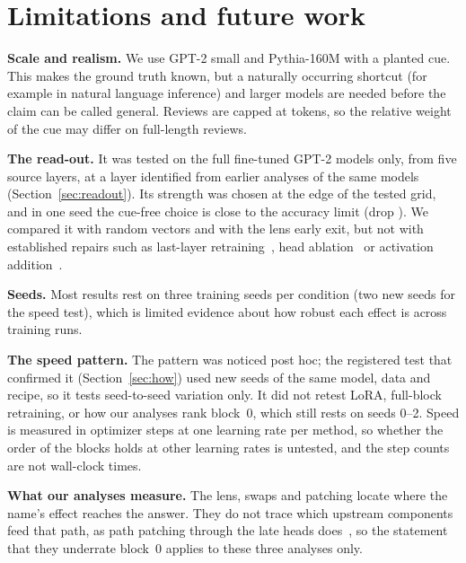 \section{Limitations and future work}
\label{sec:limitations}

\textbf{Scale and realism.} We use GPT-2 small and Pythia-160M with a planted cue. This makes the ground truth known,
but a naturally occurring shortcut (for example in natural language inference) and larger models are needed before the
claim can be called general. Reviews are capped at \reviewTokenCapPilot{} tokens, so the relative weight of the cue may
differ on full-length reviews.

\textbf{The read-out.} It was tested on the full fine-tuned GPT-2 models only, from five source layers, at a layer
identified from earlier analyses of the same models (Section~\ref{sec:readout}). Its strength was chosen at the edge
of the tested grid, and in one seed the cue-free choice is close to the accuracy limit (drop
\pSixBCueFreeDropFullFTsOne). We compared it with random vectors and with the lens early exit, but not with
established repairs such as last-layer retraining~\cite{kirichenko2023lastlayer}, head
ablation~\cite{eshuijs2025short} or activation addition~\cite{turner2023steering}.

\textbf{Seeds.} Most results rest on three training seeds per condition (two new seeds for the speed test), which is
limited evidence about how robust each effect is across training runs.

\textbf{The speed pattern.} The pattern was noticed post hoc; the registered test that confirmed it
(Section~\ref{sec:how}) used new seeds of the same model, data and recipe, so it tests seed-to-seed variation only. It
did not retest LoRA, full-block retraining, or how our analyses rank block~0, which still rests on seeds 0--2. Speed is measured in optimizer steps at one learning rate per method, so whether the order
of the blocks holds at other learning rates is untested, and the step counts are not wall-clock times.

\textbf{What our analyses measure.} The lens, swaps and patching locate where the name's effect reaches the answer.
They do not trace which upstream components feed that path, as path patching through the late heads
does~\cite{eshuijs2025short}, so the statement that they underrate block~0 applies to these three analyses only.

